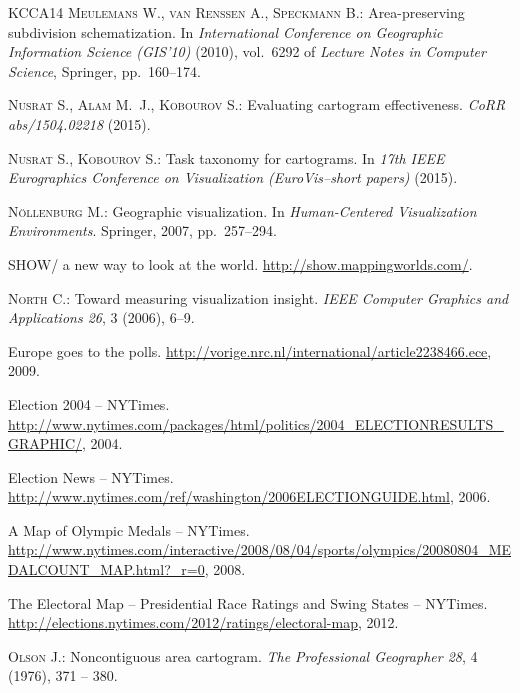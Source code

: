 \documentclass{egpubl}
\begin{document}
\begin{thebibliography}{\uppercase{KCCA{\etalchar{*}}14}}
\textsc{Meulemans W., van Renssen A., Speckmann B.}:
\newblock Area-preserving subdivision schematization.
\newblock In \emph{International Conference on Geographic Information Science
  (GIS'10)} (2010), vol.~6292 of \emph{Lecture Notes in Computer Science},
  Springer, pp.~160--174.

\textsc{Nusrat S., Alam M.~J., Kobourov S.}:
\newblock Evaluating cartogram effectiveness.
\newblock \emph{CoRR abs/1504.02218} (2015).

\textsc{Nusrat S., Kobourov S.}:
\newblock Task taxonomy for cartograms.
\newblock In \emph{17th IEEE Eurographics Conference on Visualization
  (EuroVis--short papers)} (2015).

\textsc{N{\"o}llenburg M.}:
\newblock Geographic visualization.
\newblock In \emph{Human-Centered Visualization Environments}. Springer, 2007,
  pp.~257--294.

{SHOW}\textsuperscript{\textregistered}/ a new way to look at the world.
\newblock \url{http://show.mappingworlds.com/}.

\textsc{North C.}:
\newblock Toward measuring visualization insight.
\newblock \emph{IEEE Computer Graphics and Applications 26}, 3 (2006), 6--9.

Europe goes to the polls.
\newblock \url{http://vorige.nrc.nl/international/article2238466.ece}, 2009.

{Election} 2004 -- {NYTimes}.
\newblock
  \url{http://www.nytimes.com/packages/html/politics/2004_ELECTIONRESULTS_GRAPHIC/},
  2004.

{Election News -- NYTimes}.
\newblock \url{http://www.nytimes.com/ref/washington/2006ELECTIONGUIDE.html},
  2006.

{A Map of Olympic Medals -- NYTimes}.
\newblock
  \url{http://www.nytimes.com/interactive/2008/08/04/sports/olympics/20080804_MEDALCOUNT_MAP.html?_r=0},
  2008.

{The Electoral Map -- Presidential Race Ratings and Swing States -- NYTimes}.
\newblock \url{http://elections.nytimes.com/2012/ratings/electoral-map}, 2012.

\textsc{Olson J.}:
\newblock Noncontiguous area cartogram.
\newblock \emph{The Professional Geographer 28}, 4 (1976), 371 -- 380.


\end{thebibliography}
\end{document}
